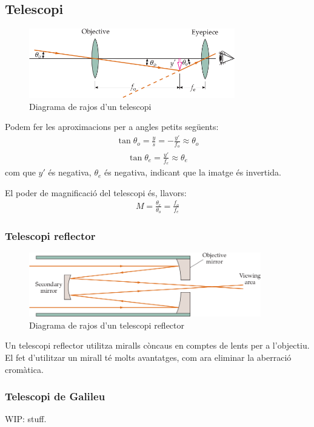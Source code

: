 \subsection{Telescopi}
\begin{figure}[H]
\centering
    \includegraphics[width=0.8\textwidth]{images/5/54-telescopi.png}
\caption{Diagrama de rajos d'un telescopi}
\end{figure}
Podem fer les aproximacions per a angles petits següents:
\begin{align}
    \boxed{\tan \theta_{o} = \frac{y}{s} = - \frac{y'}{f_{o}} \approx \theta_{o}}
\end{align}
\begin{align}
    \boxed{\tan \theta_{e} = \frac{y'}{f_{e}} \approx \theta_{e}}
\end{align}
com que $y'$ és negativa, $\theta_{e}$ és negativa, indicant que la imatge és invertida.

El poder de magnificació del telescopi és, llavors:
\begin{align}
    \boxed{M = \frac{\theta_{e}}{\theta_{o}} = \frac{f_{o}}{f_{e}}}
\end{align}

\subsubsection*{Telescopi reflector}
\begin{figure}[H]
\centering
    \includegraphics[width=0.9\textwidth]{images/5/54-telescopi-reflector.png}
\caption{Diagrama de rajos d'un telescopi reflector }
\end{figure}
Un telescopi reflector utilitza miralls còncaus en comptes de lents per a l'objectiu. El fet d'utilitzar un mirall té molts avantatges, com ara eliminar la aberració cromàtica.

\subsubsection*{Telescopi de Galileu}
WIP: stuff.